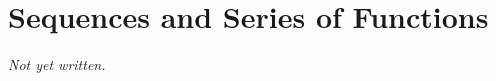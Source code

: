 \chapter{Sequences and Series of Functions}\label{ch:sequences-series-of-functions}


\textit{Not yet written.}

